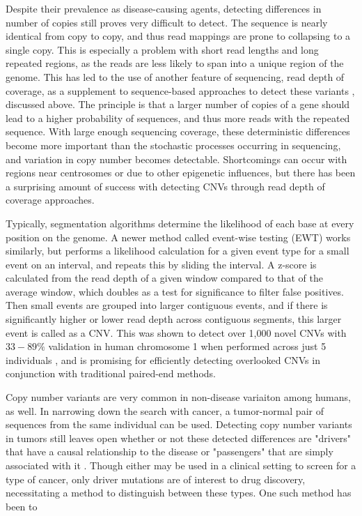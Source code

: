 \documentclass{easychithesis}
\begin{document}
Despite their prevalence as disease-causing agents, detecting differences in number of copies still proves very difficult to detect. The sequence is nearly identical from copy to copy, and thus read mappings are prone to collapsing to a single copy. This is especially a problem with short read lengths and long repeated regions, as the reads are less likely to span into a unique region of the genome. This has led to the use of another feature of sequencing, read depth of coverage, as a supplement to sequence-based approaches to detect these variants \cite{yoon2009sensitive}, discussed above. The principle is that a larger number of copies of a gene should lead to a higher probability of sequences, and thus more reads with the repeated sequence. With large enough sequencing coverage, these deterministic differences become more important than the stochastic processes occurring in sequencing, and variation in copy number becomes detectable. Shortcomings can occur with regions near centrosomes or due to other epigenetic influences, but there has been a surprising amount of success with detecting CNVs through read depth of coverage approaches.

Typically, segmentation algorithms determine the likelihood of each base at every position on the genome. A newer method called event-wise testing (EWT) \cite{yoon2009sensitive} works similarly, but performs a likelihood calculation for a given event type for a small event on an interval, and repeats this by sliding the interval. A z-score is calculated from the read depth of a given window compared to that of the average window, which doubles as a test for significance to filter false positives. Then small events are grouped into larger contiguous events, and if there is significantly higher or lower read depth across contiguous segments, this larger event is called as a CNV. This was shown to detect over 1,000 novel CNVs with $33-89\%$ validation in human chromosome 1 when performed across just 5 individuals \cite{yoon2009sensitive}, and is promising for efficiently detecting overlooked CNVs in conjunction with traditional paired-end methods.

Copy number variants are very common in non-disease variaiton among humans, as well. In narrowing down the search with cancer, a tumor-normal pair of sequences from the same individual can be used. Detecting copy number variants in tumors still leaves open whether or not these detected differences are "drivers" that have a causal relationship to the disease or "passengers" that are simply associated with it \cite{meric2015decision, robison2010application}. Though either may be used in a clinical setting to screen for a type of cancer, only driver mutations are of interest to drug discovery, necessitating a method to distinguish between these types. One such method has been to 
\end{document}

